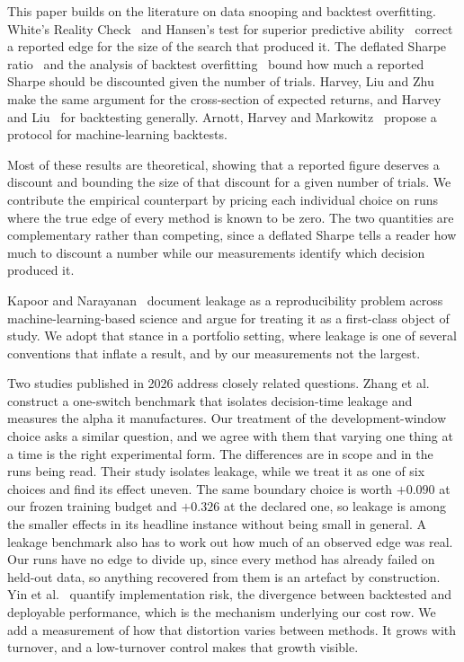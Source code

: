 \documentclass[sigconf,nonacm]{acmart}
\begin{document}
This paper builds on the literature on data snooping and backtest
overfitting. White's Reality Check~\cite{white2000reality} and Hansen's test for
superior predictive ability~\cite{hansen2005spa} correct a reported edge for the
size of the search that produced it. The deflated Sharpe
ratio~\cite{bailey2014deflated} and the analysis of backtest
overfitting~\cite{bailey2014pseudo} bound how much a reported Sharpe should be
discounted given the number of trials. Harvey, Liu and
Zhu~\cite{harvey2016cross} make the same argument for the cross-section of
expected returns, and Harvey and Liu~\cite{harvey2015backtesting} for
backtesting generally. Arnott, Harvey and Markowitz~\cite{arnott2019protocol}
propose a protocol for machine-learning backtests.

Most of these results are theoretical, showing that a reported figure deserves
a discount and bounding the size of that discount for a given number of trials.
We contribute the empirical counterpart by pricing each individual choice on
runs where the true edge of every method is known to be zero. The two
quantities are complementary rather than competing, since a deflated Sharpe
tells a reader how much to discount a number while our measurements identify
which decision produced it.

Kapoor and Narayanan~\cite{kapoor2023leakage} document leakage as a
reproducibility problem across machine-learning-based science and argue for
treating it as a first-class object of study. We adopt that stance in a
portfolio setting, where leakage is one of several conventions that inflate a
result, and by our measurements not the largest.

Two studies published in 2026 address closely related questions. Zhang et
al.~\cite{zhang2026alpha} construct a one-switch benchmark that isolates
decision-time leakage and measures the alpha it manufactures. Our treatment of
the development-window choice asks a similar question, and we agree with them
that varying one thing at a time is the right experimental form. The differences
are in scope and in the runs being read. Their study isolates leakage, while we
treat it as one of six choices and find its effect uneven. The same boundary
choice is worth $+0.090$ at our frozen training budget and $+0.326$ at the
declared one, so leakage is among the smaller effects in its headline instance
without being small in general.
A leakage benchmark also has to work out how much of an observed edge was real.
Our runs have no edge to divide up, since every method has already failed on
held-out data, so anything recovered from them is an artefact by
construction. Yin et al.~\cite{yin2026implementation} quantify implementation
risk, the divergence between backtested and deployable performance, which is the
mechanism underlying our cost row. We add a measurement of how that distortion
varies between methods. It grows with turnover, and a low-turnover control makes
that growth visible.
\end{document}
